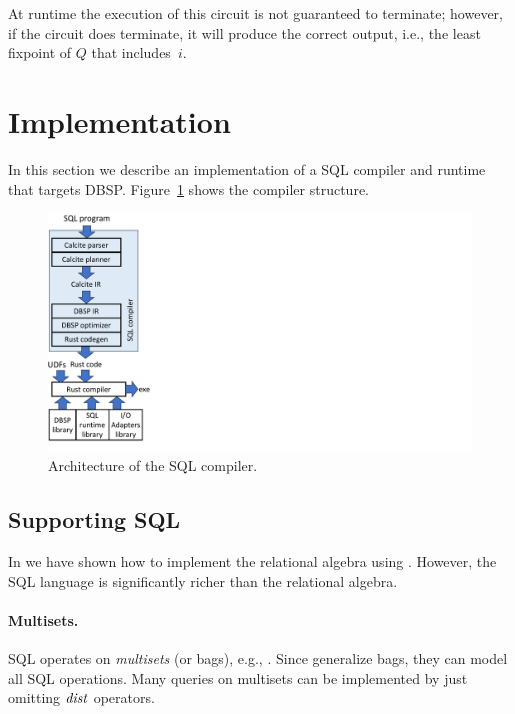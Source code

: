 At runtime the execution of this circuit is not guaranteed to terminate;
however, if the circuit does terminate, it will produce the correct
output, i.e., the least fixpoint of $Q$ that includes~$i$.

\section{Implementation}\label{sec:implementation}

In this section we describe an implementation of a SQL compiler and
runtime that targets DBSP.  Figure~\ref{fig:tools} shows the compiler
structure.

\begin{figure}[h]
  \begin{center}
    \includegraphics[trim={0 0in 10in 0},clip,scale=.45]{tools.pdf}
    \caption{\label{fig:tools}Architecture of the SQL compiler.}
  \end{center}
\end{figure}

\subsection{Supporting SQL}

In  we have shown how to implement the
relational algebra using \dbsp.  However, the SQL language is
significantly richer than the relational algebra.

\paragraph{Multisets.} SQL operates on \emph{multisets} (or bags), e.g.,
.  Since \zrs generalize bags, they can model all SQL
operations. Many queries on multisets can be implemented by just
omitting $\mathit{dist}$ operators.

